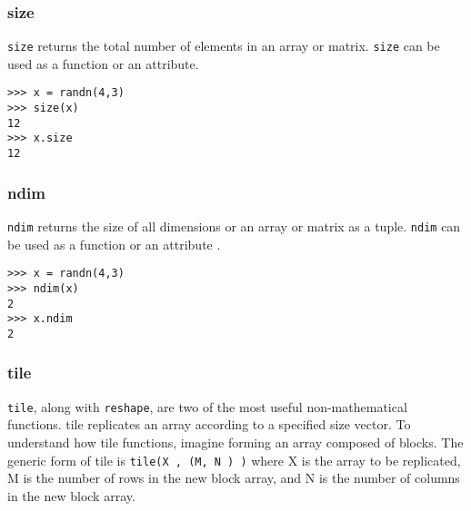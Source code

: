 \documentclass[KSmain.tex]{subfiles}
\begin{document}
\subsubsection{size}
\texttt{size} returns the total number of elements in an array or matrix. \texttt{size} can be used as a function or an
attribute.
\begin{framed}
\begin{verbatim}
>>> x = randn(4,3)
>>> size(x)
12
>>> x.size
12
\end{verbatim}
\end{framed}
\subsubsection{ndim}
\texttt{ndim} returns the size of all dimensions or an array or matrix as a tuple. \texttt{ndim} can be used as a function or
an attribute .
\begin{framed}
\begin{verbatim}
>>> x = randn(4,3)
>>> ndim(x)
2
>>> x.ndim
2
\end{verbatim}
\end{framed}
\subsubsection{tile}

\texttt{tile}, along with \texttt{reshape}, are two of the most useful non-mathematical functions. tile replicates an array
according to a specified size vector. To understand how tile functions, imagine forming an array composed
of blocks. The generic form of tile is \texttt{tile(X , (M, N ) )} where X is the array to be replicated, M is
the number of rows in the new block array, and N is the number of columns in the new block array. 
\end{document}
